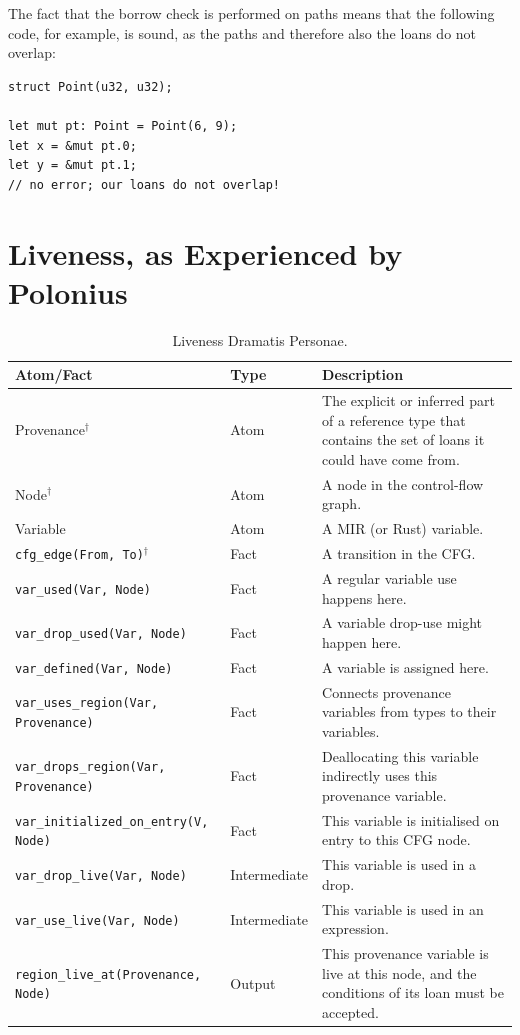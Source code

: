 \documentclass[11pt,a4paper,twoside,openany]{report}
\newcommand{\notmine}[0] {$^\dagger$}
\newcommand{\InDatalog}[1]{\texttt{#1}}
\renewcommand\_{\textunderscore\allowbreak}
\begin{document}
The fact that the borrow check is performed on paths means that the following
code, for example, is sound, as the paths and therefore also the loans do not
overlap:
\begin{verbatim}
struct Point(u32, u32);

let mut pt: Point = Point(6, 9);
let x = &mut pt.0;
let y = &mut pt.1;
// no error; our loans do not overlap!
\end{verbatim}

\section{Liveness, as Experienced by Polonius}\label{sec:liveness}

{ \renewcommand{\arraystretch}{1.0}
\begin{table}[!htbp]
  \begin{tabular}{@{}l l m{5.5cm}}
    Atom/Fact & Type & Description \\ \toprule
    Provenance\notmine{} & Atom & The explicit or inferred part of a reference type that contains the set of loans it could have come from.  \\
    Node\notmine{} & Atom & A node in the control-flow graph. \\
    Variable & Atom & A MIR (or Rust) variable. \\
    \InDatalog{cfg_edge(From, To)}\notmine{} & Fact & A transition in the CFG\@. \\
    \InDatalog{var_used(Var, Node)} & Fact & A regular variable use happens here.\\
    \InDatalog{var_drop_used(Var, Node)} & Fact & A variable drop-use might happen here.\\
    \InDatalog{var_defined(Var, Node)} & Fact & A variable is assigned here.\\
    \InDatalog{var_uses_region(Var, Provenance)} & Fact & Connects provenance variables from types to their variables.\\
    \InDatalog{var_drops_region(Var, Provenance)} & Fact & Deallocating this variable indirectly uses this provenance variable. \\
    \InDatalog{var_initialized_on_entry(V, Node)} & Fact & This variable is initialised on entry to this CFG node. \\
    \InDatalog{var_drop_live(Var, Node)} & Intermediate & This variable is used in a drop. \\
    \InDatalog{var_use_live(Var, Node)} & Intermediate & This variable is used in an expression. \\
    \InDatalog{region_live_at(Provenance, Node)} & Output & This provenance variable is live at this node, and the conditions of its loan must be accepted. \\
  \end{tabular}
\caption[Liveness Dramatis Personae]{Liveness Dramatis Personae.}\label{tab:liveness-facts-recap}
\end{table}%
}
\end{document}

